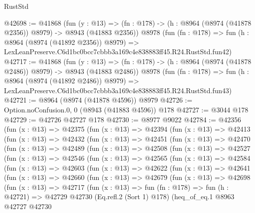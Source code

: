 \begin{lexlean}{RustStd}
\begin{coremodule}
@42698 := @41868
    (fun (y : @13) =>
    (fn : @178) -> (h : @8964 (@8974 (@41878 @2356)) @8979) -> @8943 (@41883 @2356))
    @8978
    (fun (fn : @178) =>
    fun (h : @8964 (@8974 (@41892 @2356)) @8979) =>
    LexLeanPreserve.C6d1bc0bcc7cbbb3a169c4e838883ff45.R24.RustStd.fun42)
@42717 := @41868
    (fun (y : @13) =>
    (fn : @178) -> (h : @8964 (@8974 (@41878 @2486)) @8979) -> @8943 (@41883 @2486))
    @8978
    (fun (fn : @178) =>
    fun (h : @8964 (@8974 (@41892 @2486)) @8979) =>
    LexLeanPreserve.C6d1bc0bcc7cbbb3a169c4e838883ff45.R24.RustStd.fun43)
@42721 := @8964 (@8974 (@41878 @4596)) @8979
@42726 := Option.noConfusion.{0, 0} (@8943 (@41883 @4596)) @178
@42727 := @3044 @178
@42729 := @42726 @42727 @178
@42730 := @8977 @9022
@42784 := @42356
    (fun (x : @13) =>
    @42375
      (fun (x : @13) =>
      @42394
        (fun (x : @13) =>
        @42413
          (fun (x : @13) =>
          @42432
            (fun (x : @13) =>
            @42451
              (fun (x : @13) =>
              @42470
                (fun (x : @13) =>
                @42489
                  (fun (x : @13) =>
                  @42508
                    (fun (x : @13) =>
                    @42527
                      (fun (x : @13) =>
                      @42546
                        (fun (x : @13) =>
                        @42565
                          (fun (x : @13) =>
                          @42584
                            (fun (x : @13) =>
                            @42603
                              (fun (x : @13) =>
                              @42622
                                (fun (x : @13) =>
                                @42641
                                  (fun (x : @13) =>
                                  @42660
                                    (fun (x : @13) =>
                                    @42679
                                      (fun (x : @13) =>
                                      @42698
                                        (fun (x : @13) =>
                                        @42717
                                          (fun (x : @13) =>
                                          fun (fn : @178) =>
                                          fun (h : @42721) =>
                                          @42729
                                            @42730
                                            (Eq.refl.{2} (Sort 1) @178)
                                            (heq_of_eq.{1}
                                              @8963
                                              @42727
                                              @42730

\end{coremodule}
\end{lexlean}
